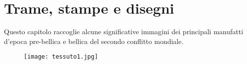 \chapter[]{Trame, stampe e disegni}
\graphicspath{ {./images/chapter4/} }

Questo capitolo raccoglie alcune significative immagini dei principali manufatti d’epoca pre-bellica e bellica del secondo conflitto mondiale.

\newpage

\begin{figure}[h]
	\centering
		\texttt{[image: tessuto1.jpg]}
	\caption{}
	\label{fig:tessuto1}
\end{figure}








\clearpage
